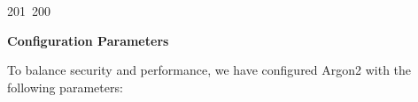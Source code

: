 201~200~\documentclass{article}
\begin{document}
	                                                                                                                                                                                                                                                                                                	                                                                                                                                        	    	                                                                                                	                                                                                                                                                                                                                                                                                                                                	                                                                        	                                                                        	                                                                                    \textbf{Configuration Parameters}

	                                                                                                                                                                                                                                                                                                	                                                                                                                                        	    	                                                                                                	                                                                                                                                                                                                                                                                                                                                	                                                                        	                                                                        	                                                                                    To balance security and performance, we have configured Argon2 with the following parameters:
\end{document}
